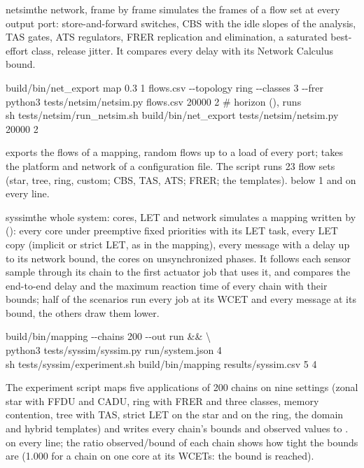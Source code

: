 \begin{experimentbox}{netsim}{the network, frame by frame}
\label{sec:ex-netsim}
  simulates the frames of a flow
set at every output port: store-and-forward switches, CBS with the idle
slopes of the analysis, TAS gates, ATS regulators, FRER replication and
elimination, a saturated best-effort class, release jitter. It compares
every delay with its Network Calculus bound.
\begin{shell}
build/bin/net\_export map 0.3 1 flows.csv -{}-topology ring -{}-classes 3 -{}-frer\\
python3 tests/netsim/netsim.py flows.csv 20000 2 \quad\# horizon (\us), runs\\
sh tests/netsim/run\_netsim.sh build/bin/net\_export tests/netsim/netsim.py 20000 2
\end{shell}
 exports the flows of a mapping,
 random flows up to a load of every port;
 takes the platform and network of a configuration file.
The script runs 23 flow sets (star, tree, ring, custom; CBS, TAS, ATS;
FRER; the templates).
  below 1 and
 on every line.
\end{experimentbox}

\begin{experimentbox}{syssim}{the whole system: cores, LET and network}
\label{sec:ex-syssim}
  simulates a mapping written by
 (): every core under preemptive fixed
priorities with its LET task, every LET copy (implicit or strict LET, as
in the mapping), every message with a delay
up to its network bound, the cores on unsynchronized phases. It follows
each sensor sample through its chain to the first actuator job that uses
it, and compares the end-to-end delay and the maximum reaction time of
every chain with their bounds; half of the scenarios run every job at its
WCET and every message at its bound, the others draw them lower.
\begin{shell}
build/bin/mapping -{}-chains 200 -{}-out run \&\& \textbackslash\\
\quad python3 tests/syssim/syssim.py run/system.json 4\\
sh tests/syssim/experiment.sh build/bin/mapping results/syssim.csv 5 4
\end{shell}
The experiment script maps five applications of 200 chains on nine
settings (zonal star with FFDU and CADU, ring with FRER and three classes,
memory contention, tree with TAS, strict LET on the star and on the ring,
the domain and hybrid templates) and
writes every chain's bounds and observed values to .
  on every line; the ratio
observed/bound of each chain shows how tight the bounds are (1.000 for a
chain on one core at its WCETs: the bound is reached).
\end{experimentbox}
